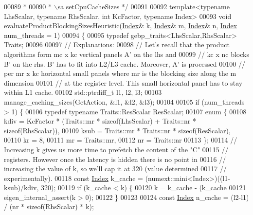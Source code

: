 \begin{DoxyCode}
00089 \textcolor{comment}{ *}
00090 \textcolor{comment}{ * \(\backslash\)sa setCpuCacheSizes */}
00091 
00092 \textcolor{keyword}{template}<\textcolor{keyword}{typename} LhsScalar, \textcolor{keyword}{typename} RhsScalar, \textcolor{keywordtype}{int} KcFactor, \textcolor{keyword}{typename} Index>
00093 \textcolor{keywordtype}{void} evaluateProductBlockingSizesHeuristic(\hyperlink{namespace_eigen_a62e77e0933482dafde8fe197d9a2cfde}{Index}& k, \hyperlink{namespace_eigen_a62e77e0933482dafde8fe197d9a2cfde}{Index}& m, \hyperlink{namespace_eigen_a62e77e0933482dafde8fe197d9a2cfde}{Index}& n, 
      \hyperlink{namespace_eigen_a62e77e0933482dafde8fe197d9a2cfde}{Index} num\_threads = 1)
00094 \{
00095   \textcolor{keyword}{typedef} gebp\_traits<LhsScalar,RhsScalar> Traits;
00096 
00097   \textcolor{comment}{// Explanations:}
00098   \textcolor{comment}{// Let's recall that the product algorithms form mc x kc vertical panels A' on the lhs and}
00099   \textcolor{comment}{// kc x nc blocks B' on the rhs. B' has to fit into L2/L3 cache. Moreover, A' is processed}
00100   \textcolor{comment}{// per mr x kc horizontal small panels where mr is the blocking size along the m dimension}
00101   \textcolor{comment}{// at the register level. This small horizontal panel has to stay within L1 cache.}
00102   std::ptrdiff\_t l1, l2, l3;
00103   manage\_caching\_sizes(GetAction, &l1, &l2, &l3);
00104 
00105   \textcolor{keywordflow}{if} (num\_threads > 1) \{
00106     \textcolor{keyword}{typedef} \textcolor{keyword}{typename} Traits::ResScalar ResScalar;
00107     \textcolor{keyword}{enum} \{
00108       kdiv = KcFactor * (Traits::mr * \textcolor{keyword}{sizeof}(LhsScalar) + Traits::nr * \textcolor{keyword}{sizeof}(RhsScalar)),
00109       ksub = Traits::mr * Traits::nr * \textcolor{keyword}{sizeof}(ResScalar),
00110       kr = 8,
00111       mr = Traits::mr,
00112       nr = Traits::nr
00113     \};
00114     \textcolor{comment}{// Increasing k gives us more time to prefetch the content of the "C"}
00115     \textcolor{comment}{// registers. However once the latency is hidden there is no point in}
00116     \textcolor{comment}{// increasing the value of k, so we'll cap it at 320 (value determined}
00117     \textcolor{comment}{// experimentally).}
00118     \textcolor{keyword}{const} \hyperlink{namespace_eigen_a62e77e0933482dafde8fe197d9a2cfde}{Index} k\_cache = (numext::mini<Index>)((l1-ksub)/kdiv, 320);
00119     \textcolor{keywordflow}{if} (k\_cache < k) \{
00120       k = k\_cache - (k\_cache %
00121       eigen\_internal\_assert(k > 0);
00122     \}
00123 
00124     \textcolor{keyword}{const} \hyperlink{namespace_eigen_a62e77e0933482dafde8fe197d9a2cfde}{Index} n\_cache = (l2-l1) / (nr * \textcolor{keyword}{sizeof}(RhsScalar) * k);

\end{DoxyCode}
